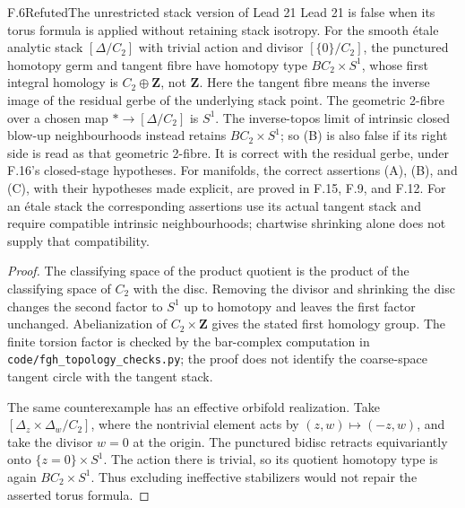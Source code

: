 \begin{statement}{F.6}{Refuted}{The unrestricted stack version of Lead 21}
Lead 21 is false when its torus formula is applied without retaining
stack isotropy. For the smooth \'etale analytic stack
$[\Delta/C_2]$ with trivial action and divisor $[\{0\}/C_2]$, the
punctured homotopy germ and tangent fibre have homotopy type
$BC_2\times S^1$, whose first integral homology is
$C_2\oplus\mathbf Z$, not $\mathbf Z$.
Here the tangent fibre means the inverse image of the residual gerbe
of the underlying stack point. The geometric 2-fibre over a chosen
map $*\to[\Delta/C_2]$ is $S^1$. The inverse-topos limit of intrinsic
closed blow-up neighbourhoods instead retains $BC_2\times S^1$;
so (B) is also false if its right side is read as that geometric
2-fibre. It is correct with the residual gerbe, under F.16's
closed-stage hypotheses.
For manifolds, the correct assertions (A), (B), and (C), with their
hypotheses made explicit, are proved in F.15, F.9, and F.12. For an
\'etale stack the corresponding assertions use its actual tangent
stack and require compatible intrinsic neighbourhoods; chartwise
shrinking alone does not supply that compatibility.
\end{statement}
\begin{proof}
The classifying space of the product quotient is the product of the
classifying space of $C_2$ with the disc. Removing the divisor and
shrinking the disc changes the second factor to $S^1$ up to homotopy
and leaves the first factor unchanged. Abelianization of
$C_2\times\mathbf Z$ gives the stated first homology group. The
finite torsion factor is checked by the bar-complex computation in
\texttt{code/fgh\_topology\_checks.py}; the proof does not identify
the coarse-space tangent circle with the tangent stack.

The same counterexample has an effective orbifold realization.
Take $[\Delta_z\times\Delta_w/C_2]$, where the nontrivial element
acts by $(z,w)\mapsto(-z,w)$, and take the divisor $w=0$ at
the origin. The punctured bidisc retracts equivariantly onto
$\{z=0\}\times S^1$. The action there is trivial, so its quotient
homotopy type is again $BC_2\times S^1$. Thus excluding ineffective
stabilizers would not repair the asserted torus formula.
\end{proof}

